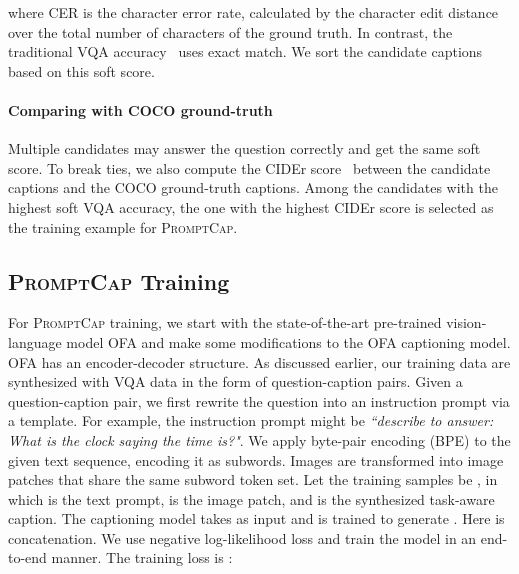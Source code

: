 \documentclass[10pt,twocolumn,letterpaper]{article}
\newcommand{\NAME}{\textsc{PromptCap}\xspace}
\begin{document}
where CER is the character error rate, calculated by the character edit distance over the total number of characters of the ground truth. 
In contrast, the traditional VQA accuracy~\cite{goyal2017making} uses exact match.
We sort the candidate captions based on this soft score.

\vspace{-0.1in}
\paragraph{Comparing with COCO ground-truth}
Multiple candidates may answer the question correctly and get the same soft score.
To break ties, we also compute the CIDEr score~\cite{vedantam2015cider} between the candidate captions and the COCO ground-truth captions.
Among the candidates with the highest soft VQA accuracy, the one with the highest CIDEr score is selected as the training example for \NAME.







\subsection{\NAME Training}
For \NAME training, we start with the state-of-the-art pre-trained vision-language model OFA \cite{wang2022ofa} and make some modifications to the OFA captioning model. 
OFA has an encoder-decoder structure.
As discussed earlier, our training data are synthesized with VQA data in the form of question-caption pairs.
Given a question-caption pair,
we first rewrite the question into an instruction prompt via a template.
For example, the instruction prompt might be
\textit{``describe to answer: What is the clock saying the time is?"}.
We apply byte-pair encoding (BPE) \cite{sennrich2015neural} to the given text sequence, encoding it as subwords.
Images are transformed into image patches that share the same subword token set.
Let the training samples be , in which  is the text prompt,  is the image patch, and  is the synthesized task-aware caption.
The captioning model takes  as input and is trained to generate . Here  is concatenation. We use negative log-likelihood loss and train the model in an end-to-end manner. The training loss is :
\end{document}
